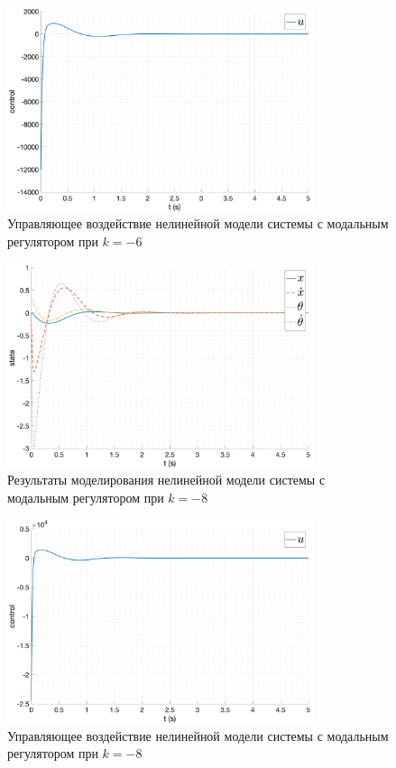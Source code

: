 \begin{figure}[ht!]
    \centering
    \includegraphics[width=0.8\textwidth]{media/plots/modal_controllers/u_2.png}
    \caption{Управляющее воздействие нелинейной модели системы с модальным регулятором при $k = -6$}
    \label{fig:modal_controlers_2_u}
\end{figure}
\begin{figure}[ht!]
    \centering
    \includegraphics[width=0.8\textwidth]{media/plots/modal_controllers/state_3.png}
    \caption{Результаты моделирования нелинейной модели системы с модальным регулятором при $k = -8$}
    \label{fig:modal_controlers_3_out}
\end{figure}
\begin{figure}[ht!]
    \centering
    \includegraphics[width=0.8\textwidth]{media/plots/modal_controllers/u_3.png}
    \caption{Управляющее воздействие нелинейной модели системы с модальным регулятором при $k = -8$}
    \label{fig:modal_controlers_3_u}
\end{figure}
